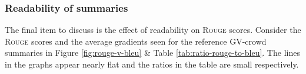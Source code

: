 \documentclass[12pt,a4paper,twoside,openright]{report}
\newcommand{\bleu}{\textsc{Bleu} }
\newcommand{\rouge}{\textsc{Rouge} }
\newcommand{\perftrans}{\textsc{Perf-Trans} }
\begin{document}







\subsubsection{Readability of summaries}
The final item to discuss is the effect of readability on \rouge scores. Consider the \rouge scores and the average gradients seen for the reference GV-crowd summaries in Figure \ref{fig:rouge-v-bleu} \& Table \ref{tab:ratio-rouge-to-bleu}. The lines in the graphs appear nearly flat and the ratios in the table are small respectively.
\end{document}
